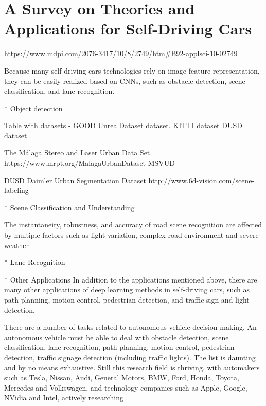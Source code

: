 \section{A Survey on Theories and Applications for Self-Driving Cars}

https://www.mdpi.com/2076-3417/10/8/2749/htm#B92-applsci-10-02749

\cite{}
Because many self-driving cars technologies rely on image feature representation, they can be easily realized based on CNNs, such as obstacle detection, scene classification, and lane recognition.

* Object detection

Table with datasets - GOOD
UnrealDataset dataset.
KITTI dataset
DUSD dataset

The Málaga Stereo and Laser Urban Data Set
https://www.mrpt.org/MalagaUrbanDataset
MSVUD

DUSD
Daimler Urban Segmentation Dataset
http://www.6d-vision.com/scene-labeling


* Scene Classification and Understanding

 The instantaneity, robustness, and accuracy of road scene recognition are affected by multiple factors such as light variation, complex road environment and severe weather
 
* Lane Recognition 

* Other Applications
In addition to the applications mentioned above, there are many other applications of deep learning methods in self-driving cars, such as 
    path planning, 
    motion control, 
    pedestrian detection, and 
    traffic sign and light detection.
    
There are a number of tasks related to autonomous-vehicle decision-making. An autonomous vehicle must be able to deal with obstacle detection, scene classification, lane recognition, path planning, motion control, pedestrian detection, traffic signage detection (including traffic lights). The list is daunting and by no means exhaustive. Still this research field is thriving, with automakers such as Tesla, Nissan, Audi, General Motors, BMW, Ford, Honda, Toyota, Mercedes and Volkswagen, and technology companies such as Apple, Google, NVidia and Intel, actively researching \cite{app10082749}.
